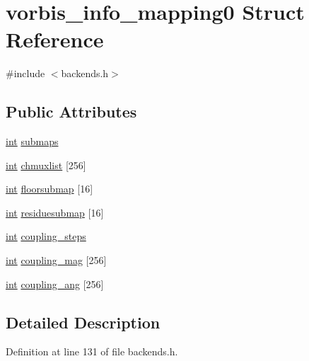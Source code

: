 \hypertarget{structvorbis__info__mapping0}{}\section{vorbis\+\_\+info\+\_\+mapping0 Struct Reference}
\label{structvorbis__info__mapping0}


{\ttfamily \#include $<$backends.\+h$>$}

\subsection*{Public Attributes}
\begin{DoxyCompactItemize}
\item 
\hyperlink{xmltok_8h_a5a0d4a5641ce434f1d23533f2b2e6653}{int} \hyperlink{structvorbis__info__mapping0_ac0b282a3786771686ce023fbd9690d58}{submaps}
\item 
\hyperlink{xmltok_8h_a5a0d4a5641ce434f1d23533f2b2e6653}{int} \hyperlink{structvorbis__info__mapping0_a65301b0ac70965455f29baf01503f959}{chmuxlist} \mbox{[}256\mbox{]}
\item 
\hyperlink{xmltok_8h_a5a0d4a5641ce434f1d23533f2b2e6653}{int} \hyperlink{structvorbis__info__mapping0_aae16b72a605d49cbbf4c8b18848e1102}{floorsubmap} \mbox{[}16\mbox{]}
\item 
\hyperlink{xmltok_8h_a5a0d4a5641ce434f1d23533f2b2e6653}{int} \hyperlink{structvorbis__info__mapping0_a279880bea4274534b86667ad7fc1ae4d}{residuesubmap} \mbox{[}16\mbox{]}
\item 
\hyperlink{xmltok_8h_a5a0d4a5641ce434f1d23533f2b2e6653}{int} \hyperlink{structvorbis__info__mapping0_ab8336109f7ccf188b8fa4b261d92be7f}{coupling\+\_\+steps}
\item 
\hyperlink{xmltok_8h_a5a0d4a5641ce434f1d23533f2b2e6653}{int} \hyperlink{structvorbis__info__mapping0_aae668f0f09c4f101de4899e8a1310c8b}{coupling\+\_\+mag} \mbox{[}256\mbox{]}
\item 
\hyperlink{xmltok_8h_a5a0d4a5641ce434f1d23533f2b2e6653}{int} \hyperlink{structvorbis__info__mapping0_a9a145ee5d8f00b7255461b262fb4e886}{coupling\+\_\+ang} \mbox{[}256\mbox{]}
\end{DoxyCompactItemize}


\subsection{Detailed Description}


Definition at line 131 of file backends.\+h.



